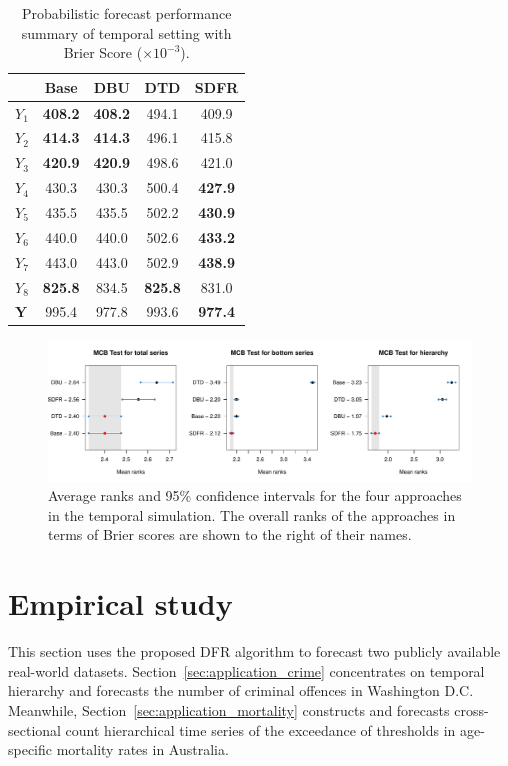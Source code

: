 \documentclass[a4paper,review,12pt,authoryear]{elsarticle}
\newcommand{\bY}{\mathbf{Y}}
\begin{document}
     \begin{table}
     \centering
     \caption{\label{tab:sim_temporal_res_dist} Probabilistic forecast performance summary of temporal setting with Brier Score ($\times 10^{-3}$).}
     \begin{tabular}{lcccc}
     \toprule
      & Base & DBU & DTD & SDFR \\\midrule
     $Y_1$ & \textbf{408.2} & \textbf{408.2} & 494.1 & 409.9 \\
     $Y_2$ & \textbf{414.3} & \textbf{414.3} & 496.1 & 415.8\\
     $Y_3$ & \textbf{420.9} & \textbf{420.9} & 498.6 & 421.0\\
     $Y_4$ & 430.3 & 430.3  & 500.4          & \textbf{427.9}\\
     $Y_5$ & 435.5 & 435.5  & 502.2          & \textbf{430.9} \\
     $Y_6$ & 440.0 & 440.0  & 502.6          & \textbf{433.2} \\
     $Y_7$ & 443.0 & 443.0  & 502.9          & \textbf{438.9} \\
     $Y_8$ & \textbf{825.8} & 834.5          & \textbf{825.8} & 831.0\\
     $\bY$ & 995.4 & 977.8  & 993.6          & \textbf{977.4} \\
     \bottomrule
     \end{tabular}
     \end{table}


     \begin{figure}
       \caption{\label{fig:sim_temporal_mcb_prob}Average ranks and 95\% confidence intervals for the four approaches in the temporal simulation. The overall ranks of the approaches in terms of Brier scores are shown to the right of their names.}
       \includegraphics[width=\textwidth]{figures/temporal_mcb.pdf}
     \end{figure}

     \section{Empirical study}
     \label{sec:application}
     This section uses the proposed DFR algorithm to forecast two publicly available real-world datasets.
     Section~\ref{sec:application_crime} concentrates on temporal hierarchy and forecasts the number of criminal offences in Washington D.C.
     Meanwhile, Section~\ref{sec:application_mortality} constructs and forecasts cross-sectional count hierarchical time series of the exceedance of thresholds in age-specific mortality rates in Australia.
\end{document}
